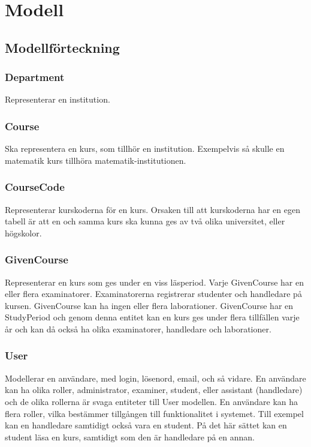 \section{Modell}
\subsection{Modellförteckning}
\subsubsection{Department}
Representerar en institution.

\subsubsection{Course}
Ska representera en kurs, som tillhör en institution. Exempelvis så skulle en matematik kurs tillhöra matematik-institutionen.

\subsubsection{CourseCode}
Representerar kurskoderna för en kurs. Orsaken till att kurskoderna har en egen tabell är att en och samma kurs ska kunna ges av två olika universitet, eller högskolor.

\subsubsection{GivenCourse}
Representerar en kurs som ges under en viss läsperiod. Varje GivenCourse har en eller flera examinatorer. Examinatorerna registrerar studenter och handledare på kursen. GivenCourse kan ha ingen eller flera laborationer. GivenCourse har en StudyPeriod och genom denna entitet kan en kurs ges under flera tillfällen varje år och kan då också ha olika examinatorer, handledare och laborationer.

\subsubsection{User}
Modellerar en användare, med login, lösenord, email, och så vidare. En användare kan ha olika roller, administrator, examiner, student, eller assistant (handledare) och de olika rollerna är svaga entiteter till User modellen. En användare kan ha flera roller, vilka bestämmer tillgången till funktionalitet i systemet. Till exempel kan en handledare samtidigt också vara en student. På det här sättet kan en student läsa en kurs, samtidigt som den är handledare på en annan. 

